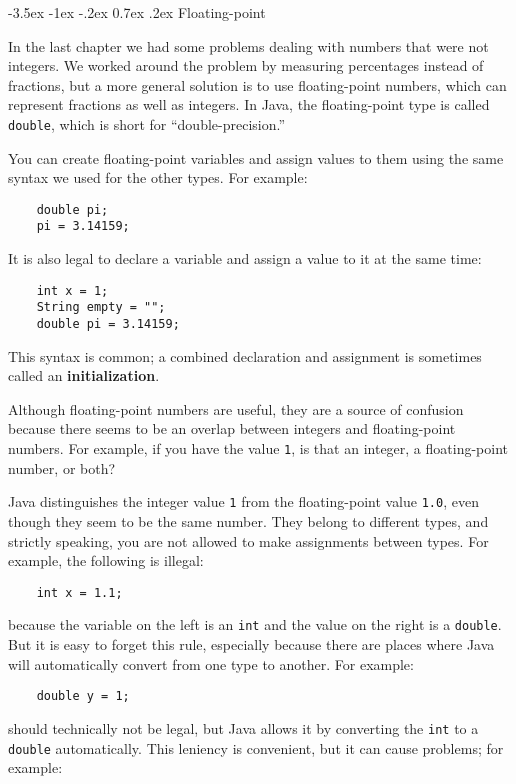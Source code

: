 \documentclass{book}
\makeatletter
\renewcommand{\section}{\@startsection 
    {section} {1} {0mm}%
    {-3.5ex \@plus -1ex \@minus -.2ex}%
    {0.7ex \@plus.2ex}%
    {\normalfont\Large\bfseries}}
\makeatother
\begin{document}
\section{Floating-point}

In the last chapter we had some problems dealing with numbers
that were not integers.  We worked around the problem by measuring
percentages instead of fractions, but a more general solution is
to use floating-point numbers, which can represent fractions
as well as integers.  In Java, the floating-point type is
called {\tt double}, which is short for ``double-precision.''

You can create floating-point variables and assign values to them
using the same syntax we used for the other types.  For example:

\begin{verbatim}
    double pi;
    pi = 3.14159;
\end{verbatim}
%
It is also legal to declare a variable and assign a value to it at the
same time:

\begin{verbatim}
    int x = 1;
    String empty = "";
    double pi = 3.14159;
\end{verbatim}
%
This syntax is common; a combined declaration
and assignment is sometimes called an {\bf initialization}.

Although floating-point numbers are useful, they are
a source of confusion because there seems to be an
overlap between integers and floating-point numbers.  For
example, if you have the value {\tt 1}, is that an integer,
a floating-point number, or both?

Java distinguishes the integer value {\tt 1}
from the floating-point value {\tt 1.0}, even though they
seem to be the same number.  They belong to
different types, and strictly speaking, you are not allowed
to make assignments between types.  For example, the following
is illegal:

\begin{verbatim}
    int x = 1.1;
\end{verbatim}
%
because the variable on the left is an {\tt int}
and the value on the right is a {\tt double}.  But it is easy
to forget this rule, especially because there are places where Java
will automatically convert from one type to another.
For example:

\begin{verbatim}
    double y = 1;
\end{verbatim}
%
should technically not be legal, but Java allows it by converting the
{\tt int} to a {\tt double} automatically.  This leniency is
convenient, but it can cause problems; for example:
\end{document}
